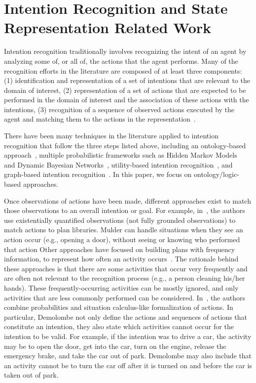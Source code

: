\documentclass[preprint,12pt]{elsarticle}
\begin{document}
\section{Intention Recognition and State Representation Related Work }\label{S:section1}
Intention recognition traditionally involves recognizing the intent of an agent by analyzing some of, or all of, the actions that the agent performs. Many of the recognition efforts in the literature are composed of at least three components: (1) identification and representation of a set of intentions that are relevant to the domain of interest, (2) representation of a set of actions that are expected to be performed in the domain of interest and the association of these actions with the intentions, (3) recognition of a sequence of observed actions executed by the agent and matching them to the actions in the representation~\cite{SADRI.2011}.


There have been many techniques in the literature applied to intention recognition that follow the three steps listed above, including an ontology-based approach~\cite{JEON.ICMUE.2008}, multiple probabilistic frameworks such as  Hidden Markov Models~\cite{KELLEY.ICHRI.2008} and Dynamic Bayesian Networks~\cite{SCHREMPF.ICAR.2005}, utility-based intention recognition~\cite{MAO.AAMAS.2004}, and graph-based intention recognition~\cite{YOUN.IJASET.2008}. In this paper, we focus on ontology/logic-based approaches.


Once observations of actions have been made, different approaches exist to match those observations to an overall intention or goal. For example, in~\cite{MULDER.IF.2003}, the authors use existentially quantified observations (not fully grounded observations) to match actions to plan libraries. Mulder can handle situations when they see an action occur (e.g., opening a door), without seeing or knowing who performed that action Other approaches have focused on building plans with frequency information, to represent how often an activity occurs~\cite{JARVIS.AIM.2005}. The rationale behind these approaches is that there are some activities that occur very frequently and are often not relevant to the recognition process (e.g., a person cleaning his/her hands). These frequently-occurring activities can be mostly ignored, and only activities that are less commonly performed can be considered. In~\cite{DEMOLOMBE.CLIMA.2005}, the authors combine probabilities and situation calculus-like formalization of actions. In particular, Demolombe not only define the actions and sequences of actions that constitute an intention, they also state which activities cannot occur for the intention to be valid. For example, if the intention was to drive a car, the activity may be to open the door, get into the car, turn on the engine, release the emergency brake, and take the car out of park. Demolombe may also include that an activity cannot be to turn the car off after it is turned on and before the car is taken out of park.
\end{document}
